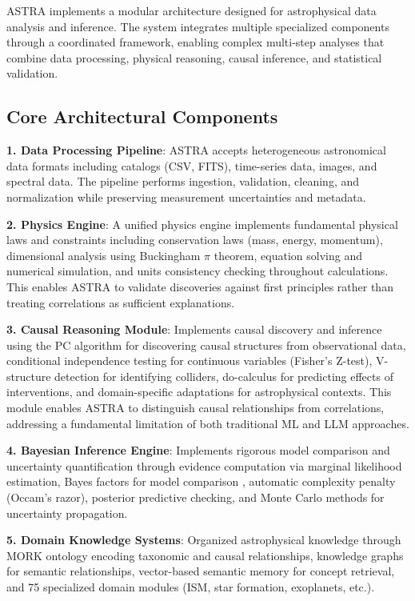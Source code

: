 \documentclass[usenatbib]{rasti}
\begin{document}
ASTRA implements a modular architecture designed for astrophysical data analysis and inference. The system integrates multiple specialized components through a coordinated framework, enabling complex multi-step analyses that combine data processing, physical reasoning, causal inference, and statistical validation.

\subsection{Core Architectural Components}

\textbf{1. Data Processing Pipeline}: ASTRA accepts heterogeneous astronomical data formats including catalogs (CSV, FITS), time-series data, images, and spectral data. The pipeline performs ingestion, validation, cleaning, and normalization while preserving measurement uncertainties and metadata.

\textbf{2. Physics Engine}: A unified physics engine implements fundamental physical laws and constraints including conservation laws (mass, energy, momentum), dimensional analysis using Buckingham $\pi$ theorem, equation solving and numerical simulation, and units consistency checking throughout calculations. This enables ASTRA to validate discoveries against first principles rather than treating correlations as sufficient explanations.

\textbf{3. Causal Reasoning Module}: Implements causal discovery and inference using the PC algorithm \cite{spirtes2000} for discovering causal structures from observational data, conditional independence testing for continuous variables (Fisher's Z-test), V-structure detection for identifying colliders, do-calculus for predicting effects of interventions, and domain-specific adaptations for astrophysical contexts. This module enables ASTRA to distinguish causal relationships from correlations, addressing a fundamental limitation of both traditional ML and LLM approaches.

\textbf{4. Bayesian Inference Engine}: Implements rigorous model comparison and uncertainty quantification through evidence computation via marginal likelihood estimation, Bayes factors for model comparison \cite{kass1995}, automatic complexity penalty (Occam's razor), posterior predictive checking, and Monte Carlo methods for uncertainty propagation.

\textbf{5. Domain Knowledge Systems}: Organized astrophysical knowledge through MORK ontology encoding taxonomic and causal relationships, knowledge graphs for semantic relationships, vector-based semantic memory for concept retrieval, and 75 specialized domain modules (ISM, star formation, exoplanets, etc.).
\end{document}
